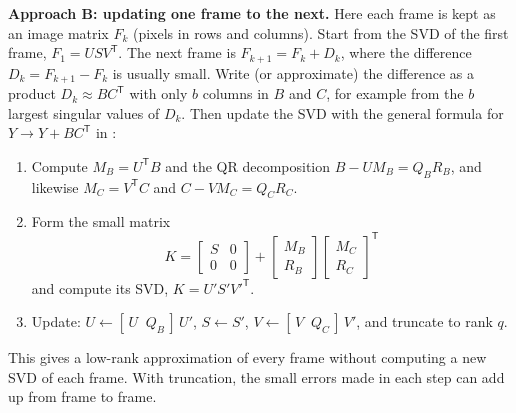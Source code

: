 \documentclass[11pt,a4paper]{article}
\begin{document}
\textbf{Approach B: updating one frame to the next.} Here each frame is kept
as an image matrix $F_k$ (pixels in rows and columns). Start from the SVD of
the first frame, $F_1 = U S V^{\mathsf{T}}$. The next frame is
$F_{k+1} = F_k + D_k$, where the difference $D_k = F_{k+1} - F_k$ is usually
small. Write (or approximate) the difference as a product
$D_k \approx B C^{\mathsf{T}}$ with only $b$ columns in $B$ and $C$, for
example from the $b$ largest singular values of $D_k$. Then update the SVD
with the general formula for $Y \to Y + B C^{\mathsf{T}}$ in
\cite[Section 2.2]{kuehl}:
\begin{enumerate}
  \item Compute $M_B = U^{\mathsf{T}} B$ and the QR decomposition
        $B - U M_B = Q_B R_B$, and likewise $M_C = V^{\mathsf{T}} C$ and
        $C - V M_C = Q_C R_C$.
  \item Form the small matrix
        \begin{equation*}
          K = \begin{bmatrix} S & 0 \\ 0 & 0 \end{bmatrix}
            + \begin{bmatrix} M_B \\ R_B \end{bmatrix}
              \begin{bmatrix} M_C \\ R_C \end{bmatrix}^{\mathsf{T}}
        \end{equation*}
        and compute its SVD, $K = U' S' V'^{\mathsf{T}}$.
  \item Update: $U \leftarrow [\,U \;\; Q_B\,]\, U'$, $S \leftarrow S'$,
        $V \leftarrow [\,V \;\; Q_C\,]\, V'$, and truncate to rank $q$.
\end{enumerate}
This gives a low-rank approximation of every frame without computing a new
SVD of each frame. With truncation, the small errors made in each step can
add up from frame to frame.
\end{document}
